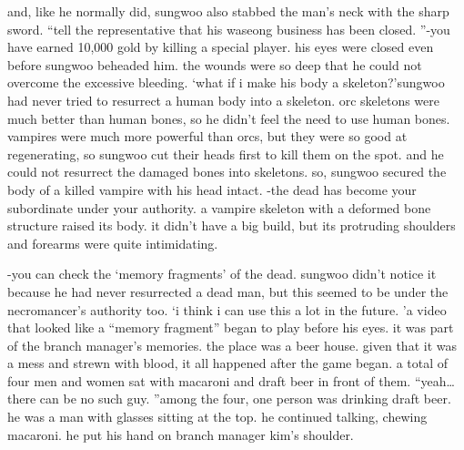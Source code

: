  and, like he normally did, sungwoo also stabbed the man’s neck with the sharp sword.
“tell the representative that his waseong business has been closed.
”-you have earned 10,000 gold by killing a special player.
his eyes were closed even before sungwoo beheaded him.
 the wounds were so deep that he could not overcome the excessive bleeding.
‘what if i make his body a skeleton?’sungwoo had never tried to resurrect a human body into a skeleton.
 orc skeletons were much better than human bones, so he didn’t feel the need to use human bones.
 vampires were much more powerful than orcs, but they were so good at regenerating, so sungwoo cut their heads first to kill them on the spot.
 and he could not resurrect the damaged bones into skeletons.
 so, sungwoo secured the body of a killed vampire with his head intact.
-the dead has become your subordinate under your authority.
a vampire skeleton with a deformed bone structure raised its body.
 it didn’t have a big build, but its protruding shoulders and forearms were quite intimidating.


-you can check the ‘memory fragments’ of the dead.
sungwoo didn’t notice it because he had never resurrected a dead man, but this seemed to be under the necromancer’s authority too.
‘i think i can use this a lot in the future.
’a video that looked like a “memory fragment” began to play before his eyes.
it was part of the branch manager’s memories.
the place was a beer house.
 given that it was a mess and strewn with blood, it all happened after the game began.
 a total of four men and women sat with macaroni and draft beer in front of them.
“yeah…there can be no such guy.
”among the four, one person was drinking draft beer.
 he was a man with glasses sitting at the top.
 he continued talking, chewing macaroni.
he put his hand on branch manager kim’s shoulder.


 